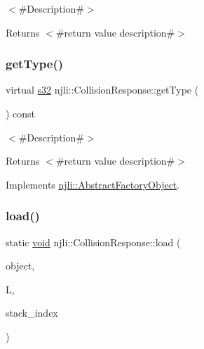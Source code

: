 $<$\#\+Description\#$>$

\begin{DoxyReturn}{Returns}
$<$\#return value description\#$>$ 
\end{DoxyReturn}
\mbox{\label{classnjli_1_1_collision_response_ac1c2878ce1f0dacc823ce51d533fc274}} 
\subsubsection{\texorpdfstring{get\+Type()}{getType()}}
{\footnotesize\ttfamily virtual \mbox{\hyperlink{_util_8h_aa62c75d314a0d1f37f79c4b73b2292e2}{s32}} njli\+::\+Collision\+Response\+::get\+Type (\begin{DoxyParamCaption}{ }\end{DoxyParamCaption}) const\hspace{0.3cm}{\ttfamily [virtual]}}

$<$\#\+Description\#$>$

\begin{DoxyReturn}{Returns}
$<$\#return value description\#$>$ 
\end{DoxyReturn}


Implements \mbox{\hyperlink{classnjli_1_1_abstract_factory_object_a207c86146d40d0794708ae7f2d4e60a7}{njli\+::\+Abstract\+Factory\+Object}}.

\mbox{\label{classnjli_1_1_collision_response_a80964006cfa86613b5f15ec53139d26b}} 
\subsubsection{\texorpdfstring{load()}{load()}}
{\footnotesize\ttfamily static \mbox{\hyperlink{_thread_8h_af1e856da2e658414cb2456cb6f7ebc66}{void}} njli\+::\+Collision\+Response\+::load (\begin{DoxyParamCaption}\item[{\mbox{\hyperlink{classnjli_1_1_collision_response}{Collision\+Response}} \&}]{object,  }\item[{lua\+\_\+\+State $\ast$}]{L,  }\item[{int}]{stack\+\_\+index }\end{DoxyParamCaption})\hspace{0.3cm}{\ttfamily [static]}}

